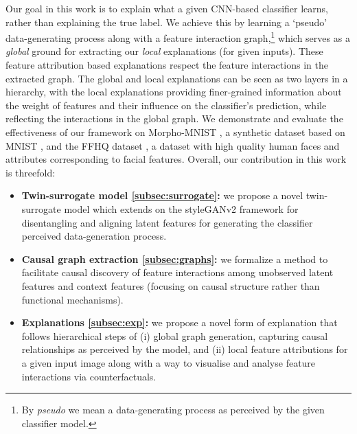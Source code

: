 \documentclass{article}
\newcommand{\akcom}[2][]{\todo[author=AK, #1]{#2}}
\newcommand{\ftcom}[2][]{\todo[author=FT, #1]{#2}}
\begin{document}
Our goal in this work is to explain what a given CNN-based classifier learns, rather than explaining the true label.
We achieve this by learning a `pseudo' data-generating process along with a feature interaction graph,\footnote{By \textit{pseudo} we mean a data-generating process as perceived by the given classifier model.}  which serves as a \emph{global} ground for extracting our \emph{local} explanations (for given inputs).
These feature attribution based explanations respect the feature interactions in the extracted graph. The global and local explanations can be seen as two layers in a hierarchy, with the local explanations providing finer-grained information about the weight of features and their influence on the classifier's prediction, while reflecting the interactions in the global graph.
We  demonstrate and evaluate the effectiveness of our framework on Morpho-MNIST \cite{castro2019morpho}, a synthetic dataset based on MNIST \cite{deng2012mnist}, and the FFHQ dataset \cite{karras2019style}, a dataset with high quality human faces and attributes corresponding to facial features.
%
Overall, our contribution in this work is threefold:
\begin{itemize}
\item \textbf{Twin-surrogate model \ref{subsec:surrogate}:} we propose a novel twin-surrogate model which extends on the styleGANv2 framework for disentangling and aligning latent features for generating the classifier perceived data-generation process.
\item \textbf{Causal graph extraction \ref{subsec:graphs}:} we formalize a method to facilitate causal discovery of feature interactions among unobserved latent features and context features (focusing on causal structure rather than functional mechanisms). 
\item \textbf{Explanations \ref{subsec:exp}:} we propose a novel form of explanation that follows hierarchical steps of (i) global graph generation, capturing causal relationships as perceived by the model, and (ii) local feature attributions for a given input image along with a way to visualise and analyse feature interactions via counterfactuals.
\end{itemize}


\end{document}
